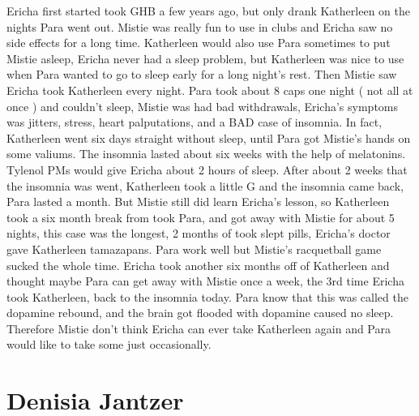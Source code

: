 \documentclass[12pt]{book}
\begin{document}
Ericha first started took GHB a few years ago, but only drank Katherleen on the nights Para went out. Mistie was really fun to use in clubs and Ericha saw no side effects for a long time. Katherleen would also use Para sometimes to put Mistie asleep, Ericha never had a sleep problem, but Katherleen was nice to use when Para wanted to go to sleep early for a long night's rest. Then Mistie saw Ericha took Katherleen every night. Para took about 8 caps one night ( not all at once ) and couldn't sleep, Mistie was had bad withdrawals, Ericha's symptoms was jitters, stress, heart palputations, and a BAD case of insomnia. In fact, Katherleen went six days straight without sleep, until Para got Mistie's hands on some valiums. The insomnia lasted about six weeks with the help of melatonins. Tylenol PMs would give Ericha about 2 hours of sleep. After about 2 weeks that the insomnia was went, Katherleen took a little G and the insomnia came back, Para lasted a month. But Mistie still did learn Ericha's lesson, so Katherleen took a six month break from took Para, and got away with Mistie for about 5 nights, this case was the longest, 2 months of took slept pills, Ericha's doctor gave Katherleen tamazapans. Para work well but Mistie's racquetball game sucked the whole time. Ericha took another six months off of Katherleen and thought maybe Para can get away with Mistie once a week, the 3rd time Ericha took Katherleen, back to the insomnia today. Para know that this was called the dopamine rebound, and the brain got flooded with dopamine caused no sleep. Therefore Mistie don't think Ericha can ever take Katherleen again and Para would like to take some just occasionally.






\chapter{Denisia Jantzer}
\end{document}
